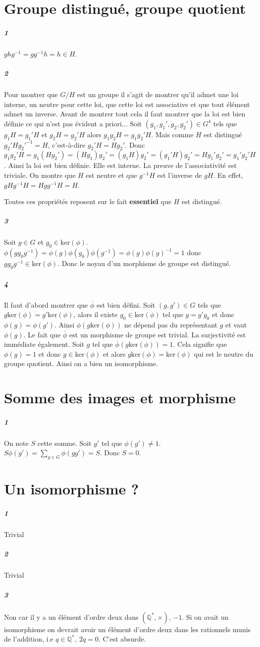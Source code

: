 \documentclass[10pt,a4paper]{article}
\begin{document}
\section{Groupe distingué, groupe quotient}
\subparagraph{1} $ghg^{-1} = gg^{-1}h = h \in H$.
\subparagraph{2} Pour montrer que $G / H $ est un groupe il s'agit de montrer qu'il admet une loi interne, un neutre pour cette loi, que cette loi est associative et que tout élément admet un inverse. Avant de montrer tout cela il faut montrer que la loi est bien définie ce qui n'est pas évident a priori...
Soit $(g_1,g_1',g_2,g_2') \in G^4$ tels que $g_1 H = g_1'H$ et $g_2 H = g_2'H$ alors $g_1g_2H = g_1g_2'H$. Mais comme $H$ est distingué $g_2'Hg_2'^{-1} = H$, c'est-à-dire $g_2'H = Hg_2'$. Donc $g_1g_2'H = g_1(Hg_2') =(Hg_1)g_2' = (g_1H)g_2' = (g_1'H)g_2' = Hg_1'g_2' =g_1'g_2'H$. Ainsi la loi est bien définie. Elle est interne. La preuve de l'associativité est triviale. On montre que $H$ est neutre et que $g^{-1}H$ est l'inverse de $gH$. En effet, $gHg^{-1}H = Hgg^{-1}H = H$. 

Toutes ces propriétés reposent sur le fait \textbf{essentiel} que $H$ est distingué. 

\subparagraph{3}Soit $g \in G$ et $g_0 \in \text{ker}(\phi)$. $\phi(gg_0g^{-1}) = \phi(g) \phi(g_0) \phi(g^{-1}) = \phi(g) \phi(g)^{-1} = 1$ donc $gg_0g^{-1} \in \text{ker}(\phi)$. Donc le noyau d'un morphisme de groupe est distingué.

\subparagraph{4}Il faut d'abord montrer que $\overline{\phi}$ est bien défini. Soit $(g,g')\in G$ tels que $g\text{ker}(\phi) = g'\text{ker}(\phi)$, alors il existe $g_0 \in \text{ker}(\phi)$ tel que $g=g'g_0$ et donc $\phi(g) = \phi(g')$. Ainsi $\phi(g\text{ker}(\phi))$ ne dépend pas du représentant $g$ et vaut $\phi(g)$. Le fait que $\overline{\phi}$ est un morphisme de groupe est trivial. La surjectivité est immédiate également. Soit $g$ tel que $\overline{\phi}(g\text{ker}(\phi)) = 1$. Cela signifie que $\phi(g) =1 $ et donc $g \in \text{ker}(\phi)$ et alors $g\text{ker}(\phi) = \text{ker}(\phi)$ qui est le neutre du groupe quotient. Ainsi on a bien un isomorphisme.

\section{Somme des images et morphisme}
\subparagraph{1}On note $S$ cette somme. Soit $g'$ tel que $\phi(g') \neq 1$. $S \phi(g') = \underset{g \in G}{\sum} \phi(gg') = S$. Donc $S=0$.
\section{Un isomorphisme ?}
\subparagraph{1}Trivial
\subparagraph{2}Trivial
\subparagraph{3}Non car il y a un élément d'ordre deux dans $(\mathbb{Q}^*,\times)$, $-1$. Si on avait un isomorphisme on devrait avoir un élément d'ordre deux dans les rationnels munis de l'addition, i.e $q \in \mathbb{Q}^*, \ 2q = 0$. C'est absurde.
\end{document}
